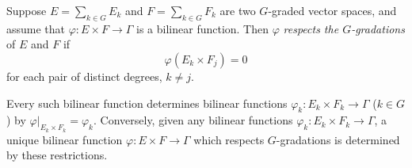 Suppose $E = \sum_{k \in G} E_k$ and $F = \sum_{k \in G} F_k$ are two $G$-graded vector spaces, and assume that $\varphi: E \times F \rightarrow \Gamma$ is a bilinear function. Then $\varphi$ \textit{respects the $G$-gradations} of $E$ and $F$ if
$$\varphi(E_k \times F_j) = 0$$
for each pair of distinct degrees, $k \neq j$.

Every such bilinear function determines bilinear functions $\varphi_k: E_k \times F_k \rightarrow \Gamma$ ($k \in G$) by $\varphi|_{E_k \times F_k} = \varphi_k$. Conversely, given any bilinear functions $\varphi_k: E_k \times F_k \rightarrow \Gamma$, a unique bilinear function $\varphi: E \times F \rightarrow \Gamma$ which respects $G$-gradations is determined by these restrictions.
